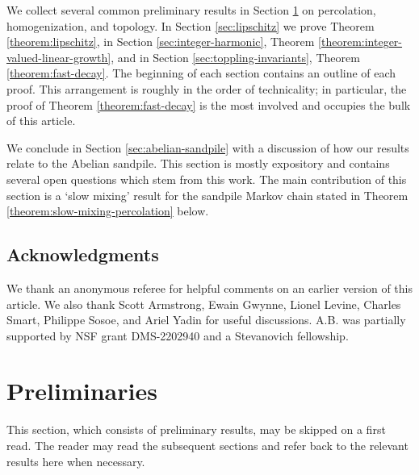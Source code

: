 \documentclass[12pt]{amsart}
\numberwithin{equation}{section}
\begin{document}
	We collect several common preliminary results in Section \ref{sec:preliminaries} on percolation, homogenization, and topology. 
	In Section \ref{sec:lipschitz} we prove Theorem \ref{theorem:lipschitz}, in Section \ref{sec:integer-harmonic}, Theorem \ref{theorem:integer-valued-linear-growth},
	and in Section \ref{sec:toppling-invariants}, Theorem \ref{theorem:fast-decay}. The beginning of each section contains an outline of each proof.  
	This arrangement is roughly in the order of technicality; in particular, the proof of Theorem \ref{theorem:fast-decay} is the most involved and occupies the bulk of this article. 
	
	We conclude in Section \ref{sec:abelian-sandpile} with a discussion of how our results relate to the Abelian sandpile. This section is mostly expository and contains several open questions which stem from this work. The main contribution of this section is a `slow mixing' result for the sandpile Markov chain stated in Theorem \ref{theorem:slow-mixing-percolation} below. 
	
	\subsection*{Acknowledgments}
	We thank an anonymous referee for helpful comments on an earlier version of this article.
	We also thank Scott Armstrong, Ewain Gwynne, Lionel Levine, Charles Smart, Philippe Sosoe, and Ariel Yadin for useful discussions.
	A.B. was partially supported by NSF grant DMS-2202940 and a Stevanovich fellowship.
	
	
	\section{Preliminaries} \label{sec:preliminaries}
	This section, which consists of preliminary results, may be skipped on a first read. The reader may read the subsequent sections 
	and refer back to the relevant results here when necessary.  
	
	
\end{document}
